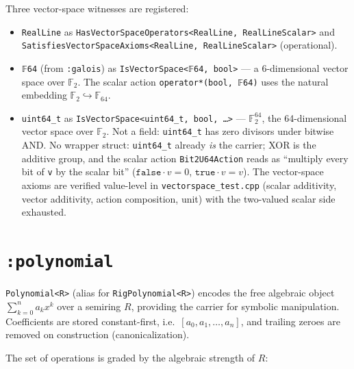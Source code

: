 \documentclass[11pt, a4paper]{report}
\begin{document}
Three vector-space witnesses are registered:

\begin{itemize}
  \item \texttt{RealLine} as \texttt{HasVectorSpaceOperators<RealLine, RealLineScalar>} and \texttt{SatisfiesVectorSpaceAxioms<RealLine, RealLineScalar>} (operational).
  \item \texttt{𝔽64} (from \texttt{:galois}) as \texttt{IsVectorSpace<𝔽64, bool>} --- a 6-dimensional vector space over $\mathbb{F}_2$. The scalar action \texttt{operator*(bool, 𝔽64)} uses the natural embedding $\mathbb{F}_2 \hookrightarrow \mathbb{F}_{64}$.
  \item \texttt{uint64\_t} as \texttt{IsVectorSpace<uint64\_t, bool, \ldots>} --- $\mathbb{F}_2^{64}$, the 64-dimensional vector space over $\mathbb{F}_2$. Not a field: \texttt{uint64\_t} has zero divisors under bitwise AND. No wrapper struct: \texttt{uint64\_t} already \emph{is} the carrier; XOR is the additive group, and the scalar action \texttt{Bit2U64Action} reads as ``multiply every bit of \texttt{v} by the scalar bit'' ($\texttt{false}\cdot v = 0$, $\texttt{true}\cdot v = v$). The vector-space axioms are verified value-level in \texttt{vectorspace\_test.cpp} (scalar additivity, vector additivity, action composition, unit) with the two-valued scalar side exhausted.
\end{itemize}

\section{\texttt{:polynomial}}
\label{sec:algebra-polynomial}

\texttt{Polynomial<R>} (alias for \texttt{RigPolynomial<R>}) encodes the free algebraic object
$\sum_{k=0}^{n} a_k x^k$ over a semiring $R$, providing the carrier for symbolic manipulation.
Coefficients are stored constant-first, i.e.~$[a_0, a_1, \dotsc, a_n]$, and trailing zeroes are
removed on construction (canonicalization).

The set of operations is graded by the algebraic strength of $R$:
\end{document}
